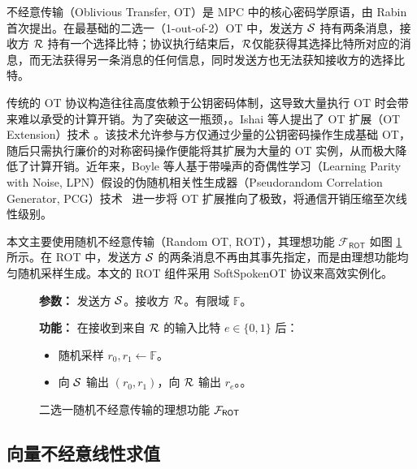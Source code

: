 不经意传输（Oblivious Transfer, OT）是 MPC 中的核心密码学原语，由 Rabin \cite{Rabin05} 首次提出。在最基础的二选一（1-out-of-2）OT 中，发送方 $\mathcal{S}$ 持有两条消息，接收方 $\mathcal{R}$ 持有一个选择比特；协议执行结束后，$\mathcal{R}$仅能获得其选择比特所对应的消息，而无法获得另一条消息的任何信息，同时发送方也无法获知接收方的选择比特。

传统的 OT 协议构造往往高度依赖于公钥密码体制，这导致大量执行 OT 时会带来难以承受的计算开销。为了突破这一瓶颈，。Ishai 等人提出了 OT 扩展（OT Extension）技术 \cite{IKNP-CRYPTO-2003}。该技术允许参与方仅通过少量的公钥密码操作生成基础 OT，随后只需执行廉价的对称密码操作便能将其扩展为大量的 OT 实例，从而极大降低了计算开销。近年来，Boyle 等人基于带噪声的奇偶性学习（Learning Parity with Noise, LPN）假设的伪随机相关性生成器（Pseudorandom Correlation Generator, PCG）技术~\cite{BCGIKS19,BCGIKRS19,RRT23} 进一步将 OT 扩展推向了极致，将通信开销压缩至次线性级别。

本文主要使用随机不经意传输（Random OT, ROT），其理想功能 $\mathcal{F}_{\mathsf{ROT}}$ 如图 \ref{fig:func-rot} 所示。在 ROT 中，发送方 $\mathcal{S}$ 的两条消息不再由其事先指定，而是由理想功能均匀随机采样生成。本文的 ROT 组件采用 SoftSpokenOT \cite{Roy22} 协议来高效实例化。

\begin{figure}[!htb]
\begin{framed}
\begin{minipage}[center]{\textwidth}
\begin{trivlist}
\item \textbf{参数：} 发送方 $\mathcal{S}$。接收方 $\mathcal{R}$。有限域 $\mathbb{F}$。
\item \textbf{功能：} 在接收到来自 $\mathcal{R}$ 的输入比特 $e \in \{0,1\}$ 后：
\begin{itemize}[itemsep=2pt,topsep=0pt,parsep=0pt,leftmargin=10pt]
    \item 随机采样 $r_0, r_1 \gets \mathbb{F}$。
    \item 向 $\mathcal{S}$ 输出 $(r_0, r_1)$，向 $\mathcal{R}$ 输出 $r_e$。。
\end{itemize}
\end{trivlist}
\end{minipage}
\end{framed}
\caption{二选一随机不经意传输的理想功能 $\mathcal{F}_\mathsf{ROT}$}\label{fig:func-rot}
\end{figure}

\subsection{向量不经意线性求值}

